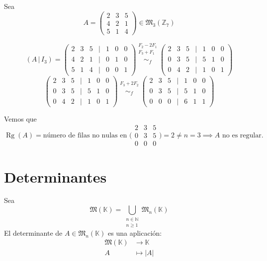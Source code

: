 \documentclass[a4paper,12pt]{article}
\begin{document}
\begin{ejemplo}[title=Ejemplo de matriz no regular en $\mathbb{Z}_7$]
Sea
\[
A =
\begin{pmatrix}
2 & 3 & 5 \\
4 & 2 & 1 \\
5 & 1 & 4
\end{pmatrix} \in \mathfrak{M}_3(\mathbb{Z}_7)
\]

\[
(A\,|\,I_3) =
\begin{pmatrix}
2 & 3 & 5 & \Big| & 1 & 0 & 0 \\
4 & 2 & 1 & \Big| & 0 & 1 & 0 \\
5 & 1 & 4 & \Big| & 0 & 0 & 1
\end{pmatrix}
\overset{\substack{F_2 - 2 F_1 \\ F_3 + F_1 \\{}}}{\sim_f}
\begin{pmatrix}
2 & 3 & 5 & \Big| & 1 & 0 & 0 \\
0 & 3 & 5 & \Big| & 5 & 1 & 0 \\
0 & 4 & 2 & \Big| & 1 & 0 & 1
\end{pmatrix}
\]
\[
\begin{pmatrix}
2 & 3 & 5 & \Big| & 1 & 0 & 0 \\
0 & 3 & 5 & \Big| & 5 & 1 & 0 \\
0 & 4 & 2 & \Big| & 1 & 0 & 1
\end{pmatrix}
\overset{\substack{F_3 + 2 F_2 \\{}}}{\sim_f}
\begin{pmatrix}
2 & 3 & 5 & \Big| & 1 & 0 & 0 \\
0 & 3 & 5 & \Big| & 5 & 1 & 0 \\
0 & 0 & 0 & \Big| & 6 & 1 & 1
\end{pmatrix}
\]

Vemos que $\operatorname{Rg}(A) = \text{número de filas no nulas en } 
\bigl(\!\begin{smallmatrix} 2 & 3 & 5 \\ 0 & 3 & 5 \\ 0 & 0 & 0 \end{smallmatrix}\!\bigr)
= 2 \neq n = 3 \implies A \text{ no es regular.}$
\end{ejemplo}

\section{Determinantes}

\begin{procedimiento}[title=Definición de determinante]
Sea 
\[
\mathfrak{M}(\mathbb{K}) = \bigcup_{\substack{n \in \mathbb{N} \\ n \ge 1}} \mathfrak{M}_n(\mathbb{K})
\]
El determinante de $A \in \mathfrak{M}_n(\mathbb{K})$ es una aplicación:
\[
\begin{aligned}
\mathfrak{M}(\mathbb{K}) &\longrightarrow \mathbb{K} \\
A &\longmapsto |A|
\end{aligned}
\]
\end{procedimiento}
\end{document}
